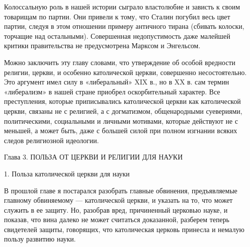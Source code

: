 Колоссальную  роль в  нашей истории  сыграло властолюбие  и зависть  к
своим товарищам по партии. Они привели к тому, что Сталин погубил весь
цвет партии, следуя в этом отношении примеру античного тирана (сбивать
колоски,  торчащие над  остальными).  Совершенная недопустимость  даже
малейшей критики правительства не предусмотрена Марксом и Энгельсом.

Можно  заключить   эту  главу  словами,  что   утверждение  об  особой
вредности религии, церкви, и  особенно католической церкви, совершенно
несостоятельно. Это аргумент имел силу в «либеральный» XIX в., но в XX
в.  сам термин  «либерализм»  в нашей  стране приобрел  оскорбительный
характер. Все преступления,  которые приписывались католической церкви
как  католической церкви,  связаны  не с  религией,  а с  догматизмом,
общенародными   суевериями,  политическими,   социальными  и   личными
мотивами, которые действуют не с меньшей, а может быть, даже с большей
силой при полном изгнании всяких следов религиозной идеологии.

Глава 3. ПОЛЬЗА ОТ ЦЕРКВИ И РЕЛИГИИ ДЛЯ НАУКИ

1. Польза католической церкви для науки

В   прошлой   главе   я  постарался   разобрать   главные   обвинения,
предъявляемые главному обвиняемому ---  католической церкви, и указать
на то, что  может служить в ее защиту. Но,  разобрав вред, причиненный
церковью  науке,  и  показав,  что  вина  далеко  не  может  считаться
доказанной,   разберем  теперь   свидетелей  защиты,   говорящих,  что
католическая церковь принесла и немалую пользу развитию науки.

